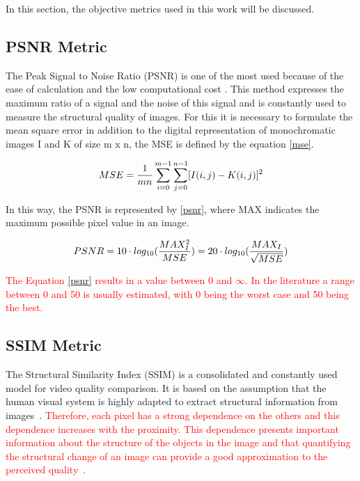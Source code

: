 \documentclass[journal]{IEEEtran}
\begin{document}
In this section, the objective metrics used in this work will be discussed.

\subsection{PSNR Metric}

The Peak Signal to Noise Ratio (PSNR) is one of the most used because of the ease of calculation and the low computational cost \cite{danilo:15}. This method expresses the maximum ratio of a signal and the noise of this signal and is constantly used to measure the structural quality of images. For this it is necessary to formulate the mean square error in addition to the digital representation of monochromatic images I and K of size m x n, the MSE is defined by the equation \ref{mse}.

\begin{equation}
	\centering
	\label{mse}
	MSE=\frac{1}{mn}\sum_{i=0}^{m-1}\sum_{j=0}^{n-1}[I(i,j)-K(i,j)]^{2}
\end{equation}

In this way, the PSNR is represented by \ref{psnr}, where MAX indicates the maximum possible pixel value in an image.

\begin{equation}
	\centering
	\label{psnr}
	PSNR = 10 \cdot log_{10}(\frac{MAX^{2}_{I}}{MSE}) = 20 \cdot log_{10}(\frac{MAX_{I}}{\sqrt{MSE}})  
\end{equation}

\textcolor{red}{
The Equation \ref{psnr} results in a value between 0 and $\infty$. In the literature a range between 0 and 50 is usually estimated, with 0 being the worst case and 50 being the best.
}

\subsection{SSIM Metric}


The Structural Similarity Index (SSIM) is a consolidated and constantly used model for video quality comparison. It is based on the assumption that the human visual system is highly adapted to extract structural information from images~\cite{danilo:12}. \textcolor{red}{ Therefore, each pixel has a strong dependence on the others and this dependence increases with the proximity. This dependence presents important information about the structure of the objects in the image and that quantifying the structural change of an image can provide a good approximation to the perceived quality~\cite{Wang:02}.}
\end{document}
